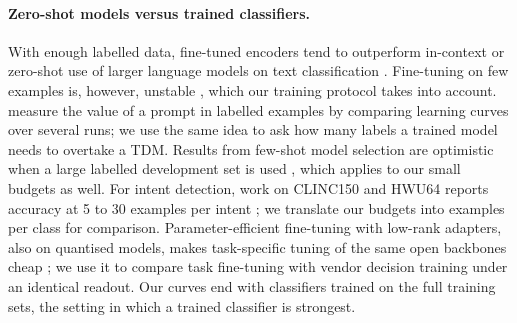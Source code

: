 \paragraph{Zero-shot models versus trained classifiers.}
With enough labelled data, fine-tuned encoders tend to outperform in-context or zero-shot use of larger language models
on text classification \citep{edwards2024language,bucher2024finetuned}. Fine-tuning on few examples is, however, unstable \citep{mosbach2021stability,zhang2021revisiting}, which our
training protocol takes into account. \citet{lescao2021howmany} measure the value of a prompt in labelled examples by
comparing learning curves over several runs; we use the same idea to ask how many labels a trained model needs to
overtake a TDM. Results from few-shot model selection are optimistic when a large labelled development set is used
\citep{perez2021true}, which applies to our small budgets as well. For intent detection, work on CLINC150 and HWU64
reports accuracy at 5 to 30 examples per intent \citep{casanueva2020efficient,zhang2021fewshot}; we translate our budgets
into examples per class for comparison. Parameter-efficient fine-tuning with low-rank adapters, also on quantised
models, makes task-specific tuning of the same open backbones cheap \citep{hu2022lora,dettmers2023qlora}; we use it to
compare task fine-tuning with vendor decision training under an identical readout. Our curves end with classifiers
trained on the full training sets, the setting in which a trained classifier is strongest.
